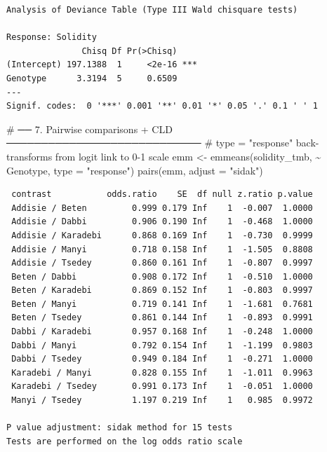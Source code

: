 \documentclass[
  letterpaper,
  DIV=11,
  numbers=noendperiod]{scrartcl}
\newenvironment{Shaded}{\begin{snugshade}}{\end{snugshade}}
\newcommand{\AttributeTok}[1]{\textcolor[rgb]{0.40,0.45,0.13}{#1}}
\newcommand{\CommentTok}[1]{\textcolor[rgb]{0.37,0.37,0.37}{#1}}
\newcommand{\FunctionTok}[1]{\textcolor[rgb]{0.28,0.35,0.67}{#1}}
\newcommand{\NormalTok}[1]{\textcolor[rgb]{0.00,0.23,0.31}{#1}}
\newcommand{\OtherTok}[1]{\textcolor[rgb]{0.00,0.23,0.31}{#1}}
\newcommand{\SpecialCharTok}[1]{\textcolor[rgb]{0.37,0.37,0.37}{#1}}
\newcommand{\StringTok}[1]{\textcolor[rgb]{0.13,0.47,0.30}{#1}}
\begin{document}
\begin{verbatim}
Analysis of Deviance Table (Type III Wald chisquare tests)

Response: Solidity
               Chisq Df Pr(>Chisq)    
(Intercept) 197.1388  1     <2e-16 ***
Genotype      3.3194  5     0.6509    
---
Signif. codes:  0 '***' 0.001 '**' 0.01 '*' 0.05 '.' 0.1 ' ' 1
\end{verbatim}

\begin{Shaded}
\begin{Highlighting}[]
\CommentTok{\# ── 7. Pairwise comparisons + CLD ────────────────────────────}
\CommentTok{\# type = "response" back{-}transforms from logit link to 0{-}1 scale}
\NormalTok{emm }\OtherTok{\textless{}{-}} \FunctionTok{emmeans}\NormalTok{(solidity\_tmb, }\SpecialCharTok{\textasciitilde{}}\NormalTok{ Genotype, }\AttributeTok{type =} \StringTok{"response"}\NormalTok{)}
\FunctionTok{pairs}\NormalTok{(emm, }\AttributeTok{adjust =} \StringTok{"sidak"}\NormalTok{)}
\end{Highlighting}
\end{Shaded}

\begin{verbatim}
 contrast           odds.ratio    SE  df null z.ratio p.value
 Addisie / Beten         0.999 0.179 Inf    1  -0.007  1.0000
 Addisie / Dabbi         0.906 0.190 Inf    1  -0.468  1.0000
 Addisie / Karadebi      0.868 0.169 Inf    1  -0.730  0.9999
 Addisie / Manyi         0.718 0.158 Inf    1  -1.505  0.8808
 Addisie / Tsedey        0.860 0.161 Inf    1  -0.807  0.9997
 Beten / Dabbi           0.908 0.172 Inf    1  -0.510  1.0000
 Beten / Karadebi        0.869 0.152 Inf    1  -0.803  0.9997
 Beten / Manyi           0.719 0.141 Inf    1  -1.681  0.7681
 Beten / Tsedey          0.861 0.144 Inf    1  -0.893  0.9991
 Dabbi / Karadebi        0.957 0.168 Inf    1  -0.248  1.0000
 Dabbi / Manyi           0.792 0.154 Inf    1  -1.199  0.9803
 Dabbi / Tsedey          0.949 0.184 Inf    1  -0.271  1.0000
 Karadebi / Manyi        0.828 0.155 Inf    1  -1.011  0.9963
 Karadebi / Tsedey       0.991 0.173 Inf    1  -0.051  1.0000
 Manyi / Tsedey          1.197 0.219 Inf    1   0.985  0.9972

P value adjustment: sidak method for 15 tests 
Tests are performed on the log odds ratio scale 
\end{verbatim}
\end{document}
